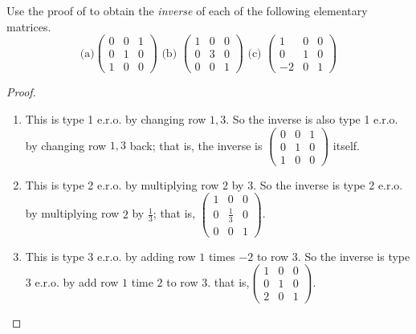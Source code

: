 \begin{exercise} \label{exercise 3.1.3}
Use the proof of  to obtain the \emph{inverse} of each of the following elementary matrices.
\[
    \text{(a)} \left(\begin{array}{lll}0 & 0 & 1 \\ 0 & 1 & 0 \\ 1 & 0 & 0\end{array}\right)
    \text{ (b) } \left(\begin{array}{lll}1 & 0 & 0 \\ 0 & 3 & 0 \\ 0 & 0 & 1\end{array}\right)
    \text{ (c) } \left(\begin{array}{rrr}1 & 0 & 0 \\ 0 & 1 & 0 \\ -2 & 0 & 1\end{array}\right)
\]
\end{exercise}

\begin{proof} \ 

\begin{enumerate}
\item This is type 1 e.r.o. by changing row \(1, 3\).
So the inverse is also type 1 e.r.o. by changing row \(1, 3\) back;
that is, the inverse is \(\begin{pmatrix} 0 & 0 & 1 \\ 0 & 1 & 0 \\ 1 & 0 & 0 \end{pmatrix}\) itself.

\item This is type 2 e.r.o. by multiplying row \(2\) by \(3\).
So the inverse is type 2 e.r.o. by multiplying row \(2\) by \(\frac1{3}\);
that is, \(\begin{pmatrix} 1 & 0 & 0 \\ 0 & \frac1{3} & 0 \\ 0 & 0 & 1 \end{pmatrix}\).

\item This is type 3 e.r.o. by adding row \(1\) times \(-2\) to row \(3\).
So the inverse is type 3 e.r.o. by add row \(1\) time \(2\) to row \(3\).
that is,\(\begin{pmatrix} 1 & 0 & 0 \\ 0 & 1 & 0 \\ 2 & 0 & 1 \end{pmatrix}\).
\end{enumerate}
\end{proof}


